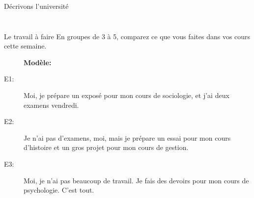 \documentclass{beamer}
\begin{document}
\begin{frame}{Décrivons l'université}
\begin{columns}
\begin{minipage}[c][0.6\textheight]{\linewidth}
\begin{center}
{            }
          \end{center}
        \end{minipage}
    \end{columns}
  \end{frame}

  \begin{frame}{Le travail à faire}
    En groupes de 3 à 5, comparez ce que vous faites dans vos cours cette semaine. \\
    \begin{description}
      \item[] \textbf{Modèle:}
      \item[E1:] Moi, je prépare un exposé pour mon cours de sociologie, et j'ai deux examens vendredi.
      \item[E2:] Je n'ai pas d'examens, moi, mais je prépare un essai pour mon cours d'histoire et un gros projet pour mon cours de gestion.
      \item[E3:] Moi, je n'ai pas beaucoup de travail. Je fais des devoirs pour mon cours de psychologie. C'est tout.
    \end{description}
  \end{frame}
\end{document}
